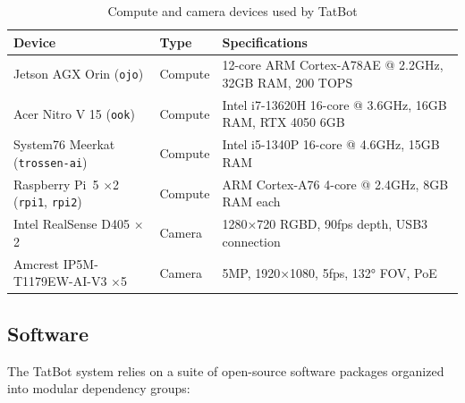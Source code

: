 \documentclass[11pt]{article}
\begin{document}
\begin{table}[h]
    \centering
    \caption{Compute and camera devices used by TatBot}
    \label{tab:hardware-devices}
    \begin{tabular}{lll}
        \toprule
        Device & Type & Specifications \\
        \midrule
        Jetson AGX Orin (\texttt{ojo}) & Compute & 12-core ARM Cortex-A78AE @ 2.2GHz, 32GB RAM, 200 TOPS \\
        Acer Nitro V 15 (\texttt{ook}) & Compute & Intel i7-13620H 16-core @ 3.6GHz, 16GB RAM, RTX 4050 6GB \\
        System76 Meerkat (\texttt{trossen-ai}) & Compute & Intel i5-1340P 16-core @ 4.6GHz, 15GB RAM \\
        Raspberry Pi~5 $\times$2 (\texttt{rpi1}, \texttt{rpi2}) & Compute & ARM Cortex-A76 4-core @ 2.4GHz, 8GB RAM each \\
        Intel RealSense D405 $\times$2 & Camera & 1280×720 RGBD, 90fps depth, USB3 connection \\
        Amcrest IP5M-T1179EW-AI-V3 $\times$5 & Camera & 5MP, 1920×1080, 5fps, 132° FOV, PoE \\
        \bottomrule
    \end{tabular}
\end{table}

\subsection{Software}

The TatBot system relies on a suite of open-source software packages organized into modular dependency groups:
\end{document}
